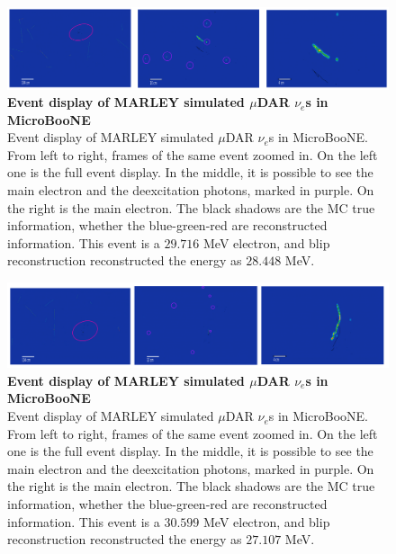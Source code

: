 \begin{figure}[h!]
    \centering
    \includegraphics[width=\textwidth]{Figures/signal_evd_1.jpeg}
    \caption[Event display of MARLEY simulated $\mu$DAR $\nu_e$s in MicroBooNE]{{\textbf{Event display of MARLEY simulated $\mu$DAR $\nu_e$s in MicroBooNE}}\\ Event display of MARLEY simulated $\mu$DAR $\nu_e$s in MicroBooNE. From left to right, frames of the same event zoomed in. On the left one is the full event display. In the middle, it is possible to see the main electron and the deexcitation photons, marked in purple. On the right is the main electron. The black shadows are the MC true information, whether the blue-green-red are reconstructed information. This event is a $29.716$ MeV electron, and blip reconstruction reconstructed the energy as $28.448$ MeV.}
    \label{signal_evd_1}
\end{figure}

\begin{figure}[h!]
    \centering
    \includegraphics[width=\textwidth]{Figures/signal_evd_2.jpeg}
    \caption[Event display of MARLEY simulated $\mu$DAR $\nu_e$s in MicroBooNE]{{\textbf{Event display of MARLEY simulated $\mu$DAR $\nu_e$s in MicroBooNE}}\\ Event display of MARLEY simulated $\mu$DAR $\nu_e$s in MicroBooNE. From left to right, frames of the same event zoomed in. On the left one is the full event display. In the middle, it is possible to see the main electron and the deexcitation photons, marked in purple. On the right is the main electron. The black shadows are the MC true information, whether the blue-green-red are reconstructed information. This event is a $30.599$ MeV electron, and blip reconstruction reconstructed the energy as $27.107$ MeV.}
 \label{signal_evd_2}
\end{figure}

